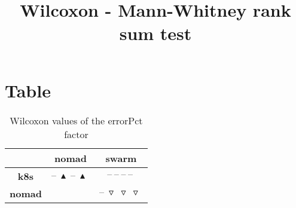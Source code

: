 \documentclass{article}
\title{Wilcoxon - Mann-Whitney rank sum test}
\author{}
\begin{document}
\maketitle
\section{Table}
\begin{table}[!htp]
  \caption{Wilcoxon values of the errorPct factor}
  \label{table:errorPct}
  \centering
  \begin{scriptsize}
  \begin{tabular}{c|cc}
      & \textbf{nomad} & \textbf{swarm} \\\hline
      \textbf{k8s} & $\text{--}\ \blacktriangle\ \text{--}\ \blacktriangle\  $ & $ \text{--}\ \text{--}\ \text{--}\ \text{--}\ $ \\
      \textbf{nomad} & $ $ & $ \text{--}\ \triangledown\ \triangledown\ \triangledown\ $ \\
  \end{tabular}
  \end{scriptsize}
\end{table}
\end{document}

